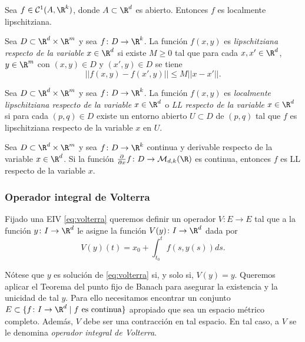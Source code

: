 \documentclass{article}
\begin{document}
\begin{corollary}
  Sea $f \in \mathcal{C}^1(A, \R^k)$, donde $A \subset \R^d$ es abierto. Entonces $f$ es localmente
  lipschitziana.
\end{corollary}

\begin{definition}
  Sea $D \subset \R^d \times \R^m$ y sea $f \colon D \to \R^k$. La función $f(x,y)$ es
  \emph{lipschitziana respecto de la variable} $x \in \R^d$ si existe $M \ge 0$ tal que para cada
  $x,x' \in \R^d$, $y \in \R^m$ con $(x,y) \in D$ y $(x', y) \in D$ se tiene
  \[ ||f(x,y)-f(x',y)|| \le M ||x-x'||. \]
\end{definition}

\begin{definition}
  Sea $D \subset \R^d \times \R^m$ y sea $f \colon D \to \R^k$. La función $f(x,y)$ es
  \emph{localmente lipschitziana respecto de la variable} $x \in \R^d$ o \emph{LL respecto de la
    variable} $x \in \R^d$ si para cada $(p,q) \in D$ existe un entorno abierto $U \subset D$ de
  $(p,q)$ tal que $f$ es lipschitziana respecto de la variable $x$ en $U$.
\end{definition}

\begin{proposition}
  Sea $D \subset \R^d \times \R^m$ y sea $f \colon D \to \R^k$ continua y derivable respecto de la
  variable $x \in \R^{d}$. Si la función
  $\frac{\partial}{\partial x}f \colon D \to \mathcal{M}_{d,k}(\R)$ es continua, entonces $f$ es LL
  respecto de la variable $x$.
\end{proposition}

\subsubsection{Operador integral de Volterra} \label{sec:eu:pl:volterra}

Fijado una EIV \eqref{eq:volterra} queremos definir un operador $V \colon E \to E$ tal que a la
función $y\colon I \to \R^d$ le asigne la función $V(y)\colon I \to \R^d$ dada por
\begin{equation}
  \label{eq:1}
  V(y)(t) = x_0 + \displaystyle\int_{t_0}^t f(s,y(s))ds.
\end{equation}

Nótese que $y$ es solución de \eqref{eq:volterra} si, y solo si, $V(y) = y$. Queremos aplicar el
Teorema del punto fijo de Banach para asegurar la existencia y la unicidad de tal $y$. Para ello
necesitamos encontrar un conjunto $E \subset \{f\colon I\to\R^d \mid f \text{ es continua}\}$
apropiado que sea un espacio métrico completo. Además, $V$ debe ser una contracción en tal
espacio. En tal caso, a $V$ se le denomina \emph{operador integral de Volterra}.
\end{document}
